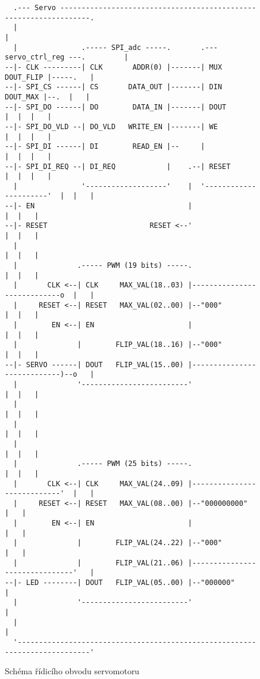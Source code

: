 \begin{figure}[h]
\label{fig:fpga_servo}
\caption{Schéma řídicího obvodu servomotoru}
\centering
\begin{Verbatim}
  .--- Servo ------------------------------------------------------------------.
  |                                                                            |
  |               .----- SPI_adc -----.       .--- servo_ctrl_reg ---.         |
--|- CLK ---------| CLK       ADDR(0) |-------| MUX        DOUT_FLIP |-----.   |
--|- SPI_CS ------| CS       DATA_OUT |-------| DIN         DOUT_MAX |--.  |   |
--|- SPI_DO ------| DO        DATA_IN |-------| DOUT                 |  |  |   |
--|- SPI_DO_VLD --| DO_VLD   WRITE_EN |-------| WE                   |  |  |   |
--|- SPI_DI ------| DI        READ_EN |--     |                      |  |  |   |
--|- SPI_DI_REQ --| DI_REQ            |    .--| RESET                |  |  |   |
  |               '-------------------'    |  '----------------------'  |  |   |
--|- EN                                    |                            |  |   |
--|- RESET                        RESET <--'                            |  |   |
  |                                                                     |  |   |
  |              .----- PWM (19 bits) -----.                            |  |   |
  |       CLK <--| CLK     MAX_VAL(18..03) |----------------------------o  |   |
  |     RESET <--| RESET   MAX_VAL(02..00) |--"000"                     |  |   |
  |        EN <--| EN                      |                            |  |   |
  |              |        FLIP_VAL(18..16) |--"000"                     |  |   |
--|- SERVO ------| DOUT   FLIP_VAL(15..00) |----------------------------)--o   |
  |              '-------------------------'                            |  |   |
  |                                                                     |  |   |
  |                                                                     |  |   |
  |                                                                     |  |   |
  |              .----- PWM (25 bits) -----.                            |  |   |
  |       CLK <--| CLK     MAX_VAL(24..09) |----------------------------'  |   |
  |     RESET <--| RESET   MAX_VAL(08..00) |--"000000000"                  |   |
  |        EN <--| EN                      |                               |   |
  |              |        FLIP_VAL(24..22) |--"000"                        |   |
  |              |        FLIP_VAL(21..06) |-------------------------------'   |
--|- LED --------| DOUT   FLIP_VAL(05..00) |--"000000"                         |
  |              '-------------------------'                                   |
  |                                                                            |
  '----------------------------------------------------------------------------'
\end{Verbatim}
\end{figure}


